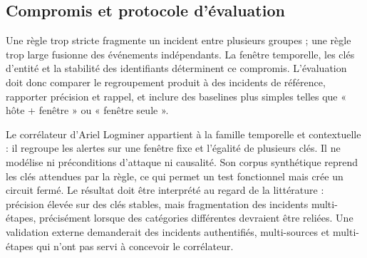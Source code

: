 \subsection{Compromis et protocole d'évaluation}

Une règle trop stricte fragmente un incident entre plusieurs groupes ; une règle trop
large fusionne des événements indépendants. La fenêtre temporelle, les clés d'entité et
la stabilité des identifiants déterminent ce compromis. L'évaluation doit donc comparer
le regroupement produit à des incidents de référence, rapporter précision et rappel, et
inclure des baselines plus simples telles que « hôte + fenêtre » ou « fenêtre seule ».

Le corrélateur d'Ariel Logminer appartient à la famille temporelle et contextuelle : il
regroupe les alertes sur une fenêtre fixe et l'égalité de plusieurs clés. Il ne modélise
ni préconditions d'attaque ni causalité. Son corpus synthétique reprend les clés attendues
par la règle, ce qui permet un test fonctionnel mais crée un circuit fermé. Le résultat
doit être interprété au regard de la littérature : précision élevée sur des clés stables,
mais fragmentation des incidents multi-étapes, précisément lorsque des catégories
différentes devraient être reliées. Une validation externe demanderait des incidents
authentifiés, multi-sources et multi-étapes qui n'ont pas servi à concevoir le
corrélateur.

